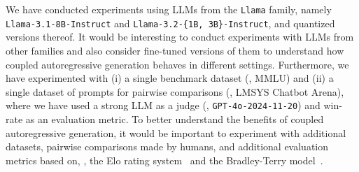 %
We have conducted experiments using LLMs from the \texttt{Llama} family, namely \texttt{Llama-3.1-8B-Instruct} and \texttt{Llama-3.2-\{1B, 3B\}-Instruct}, and quantized versions thereof. It would be interesting to conduct experiments with LLMs from other families and also consider fine-tuned versions of them to understand how coupled autoregressive generation behaves in different settings. Furthermore, we have experimented with (i) a single benchmark dataset (\ie, MMLU) and (ii) a single dataset of prompts for pairwise comparisons (\ie, LMSYS Chatbot Arena), where we have used a strong LLM as a judge (\ie, \texttt{GPT-4o-2024-11-20}) and win-rate as an evaluation metric. 
%
To better understand the benefits of coupled autoregressive generation, it would be important to experiment with additional datasets, pairwise comparisons made by humans, and additional evaluation metrics based on, \eg, the Elo rating system~\cite{askell2021general,dettmers2024qlora,bai2022training,wu2023chatarena,lin2023llm} and the Bradley-Terry model~\cite{chiang2024chatbot,boyeau2024autoeval}.